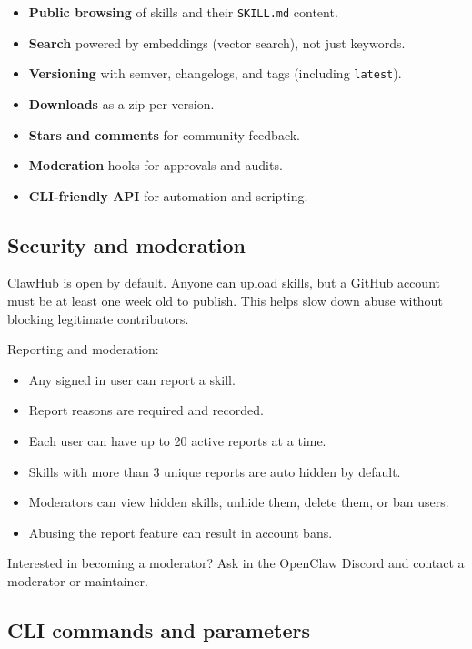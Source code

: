 \begin{itemize}
  \item \textbf{Public browsing} of skills and their \texttt{SKILL.md} content.
  \item \textbf{Search} powered by embeddings (vector search), not just keywords.
  \item \textbf{Versioning} with semver, changelogs, and tags (including \texttt{latest}).
  \item \textbf{Downloads} as a zip per version.
  \item \textbf{Stars and comments} for community feedback.
  \item \textbf{Moderation} hooks for approvals and audits.
  \item \textbf{CLI-friendly API} for automation and scripting.
\end{itemize}


\subsection{Security and moderation}


ClawHub is open by default. Anyone can upload skills, but a GitHub account must
be at least one week old to publish. This helps slow down abuse without blocking
legitimate contributors.

Reporting and moderation:

\begin{itemize}
  \item Any signed in user can report a skill.
  \item Report reasons are required and recorded.
  \item Each user can have up to 20 active reports at a time.
  \item Skills with more than 3 unique reports are auto hidden by default.
  \item Moderators can view hidden skills, unhide them, delete them, or ban users.
  \item Abusing the report feature can result in account bans.
\end{itemize}


Interested in becoming a moderator? Ask in the OpenClaw Discord and contact a
moderator or maintainer.

\subsection{CLI commands and parameters}


